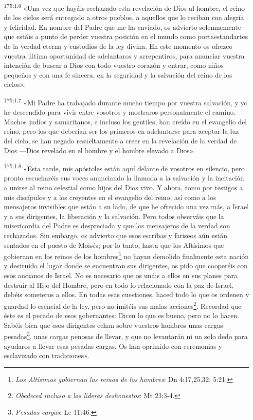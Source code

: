 \par 
\textsuperscript{175:1.6} «Una vez que hayáis rechazado esta revelación de Dios al hombre, el reino de los cielos será entregado a otros pueblos, a aquellos que lo reciban con alegría y felicidad. En nombre del Padre que me ha enviado, os advierto solemnemente que estáis a punto de perder vuestra posición en el mundo como portaestandartes de la verdad eterna y custodios de la ley divina. En este momento os ofrezco vuestra última oportunidad de adelantaros y arrepentiros, para anunciar vuestra intención de buscar a Dios con todo vuestro corazón y entrar, como niños pequeños y con una fe sincera, en la seguridad y la salvación del reino de los cielos».

\par 
\textsuperscript{175:1.7} «Mi Padre ha trabajado durante mucho tiempo por vuestra salvación, y yo he descendido para vivir entre vosotros y mostraros personalmente el camino. Muchos judíos y samaritanos, e incluso los gentiles, han creído en el evangelio del reino, pero los que deberían ser los primeros en adelantarse para aceptar la luz del cielo, se han negado resueltamente a creer en la revelación de la verdad de Dios ---Dios revelado en el hombre y el hombre elevado a Dios».

\par 
\textsuperscript{175:1.8} «Esta tarde, mis apóstoles están aquí delante de vosotros en silencio, pero pronto escucharéis sus voces anunciando la llamada a la salvación y la incitación a unirse al reino celestial como hijos del Dios vivo. Y ahora, tomo por testigos a mis discípulos y a los creyentes en el evangelio del reino, así como a los mensajeros invisibles que están a su lado, de que he ofrecido una vez más, a Israel y a sus dirigentes, la liberación y la salvación. Pero todos observáis que la misericordia del Padre es despreciada y que los mensajeros de la verdad son rechazados. Sin embargo, os advierto que esos escribas y fariseos aún están sentados en el puesto de Moisés; por lo tanto, hasta que los Altísimos que gobiernan en los reinos de los hombres\footnote{\textit{Los Altísimos gobiernan los reinos de los hombres}: Dn 4:17,25,32; 5:21.} no hayan demolido finalmente esta nación y destruido el lugar donde se encuentran sus dirigentes, os pido que cooperéis con esos ancianos de Israel. No es necesario que os unáis a ellos en sus planes para destruir al Hijo del Hombre, pero en todo lo relacionado con la paz de Israel, debéis someteros a ellos. En todas esas cuestiones, haced todo lo que os ordenen y guardad lo esencial de la ley, pero no imitéis sus malas acciones\footnote{\textit{Obedeced incluso a los líderes deshonestos}: Mt 23:3-4.}. Recordad que éste es el pecado de esos gobernantes: Dicen lo que es bueno, pero no lo hacen. Sabéis bien que esos dirigentes echan sobre vuestros hombros unas cargas pesadas\footnote{\textit{Pesadas cargas}: Lc 11:46.}, unas cargas penosas de llevar, y que no levantarán ni un solo dedo para ayudaros a llevar esas pesadas cargas. Os han oprimido con ceremonias y esclavizado con tradiciones».


